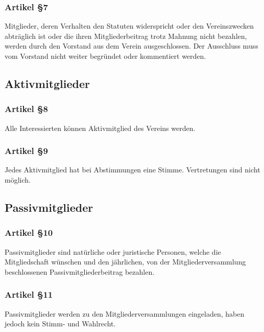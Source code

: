 \documentclass[a4paper,
               10pt,
               fleqn]{article}
\begin{document}
\subsubsection*{Artikel §7}
Mitglieder, deren Verhalten den Statuten widerspricht oder
den Vereinszwecken abträglich ist oder die ihren
Mitgliederbeitrag trotz Mahnung nicht bezahlen, werden durch
den Vorstand aus dem Verein ausgeschlossen. Der Ausschluss
muss vom Vorstand nicht weiter begründet oder kommentiert
werden.

\subsection{Aktivmitglieder}

\subsubsection*{Artikel §8}
Alle Interessierten können Aktivmitglied des Vereins werden.

\subsubsection*{Artikel §9}
Jedes Aktivmitglied hat bei Abstimmungen eine Stimme. 
Vertretungen sind nicht möglich.

\subsection{Passivmitglieder}


\subsubsection*{Artikel §10}
Passivmitglieder sind natürliche oder juristische Personen, 
welche die Mitgliedschaft wünschen und den jährlichen, von
der Mitgliederversammlung beschlossenen
Passivmitgliederbeitrag bezahlen.

\subsubsection*{Artikel §11}
Passivmitglieder werden zu den Mitgliederversammlungen 
eingeladen, haben jedoch kein Stimm- und Wahlrecht.
\end{document}
